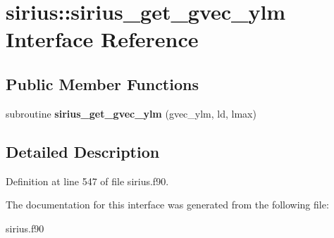 \hypertarget{interfacesirius_1_1sirius__get__gvec__ylm}{}\section{sirius\+:\+:sirius\+\_\+get\+\_\+gvec\+\_\+ylm Interface Reference}
\label{interfacesirius_1_1sirius__get__gvec__ylm}
\subsection*{Public Member Functions}
\begin{DoxyCompactItemize}
\item 
\hypertarget{interfacesirius_1_1sirius__get__gvec__ylm_a4cac438e9bd5d47b4a3ad0f23928358b}{}subroutine {\bfseries sirius\+\_\+get\+\_\+gvec\+\_\+ylm} (gvec\+\_\+ylm, ld, lmax)\label{interfacesirius_1_1sirius__get__gvec__ylm_a4cac438e9bd5d47b4a3ad0f23928358b}

\end{DoxyCompactItemize}


\subsection{Detailed Description}


Definition at line 547 of file sirius.\+f90.



The documentation for this interface was generated from the following file\+:\begin{DoxyCompactItemize}
\item 
sirius.\+f90\end{DoxyCompactItemize}

